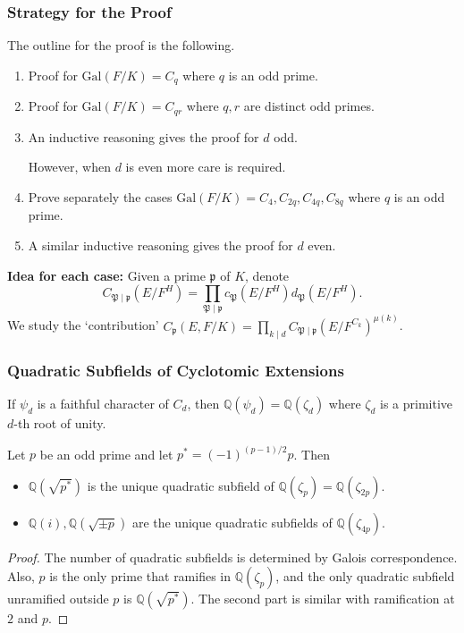 \documentclass{beamer}
\newcommand{\Gal}{\mathrm{Gal}}
\newcommand{\PP}{\mathfrak{P}}
\newcommand{\QQ}{\mathbb{Q}}
\newcommand{\pp}{\mathfrak{p}}
\theoremstyle{plain}
\begin{document}
\begin{frame}
    \frametitle{Strategy for the Proof}
    The outline for the proof is the following.
    \begin{enumerate}
        \item Proof for $\Gal(F/K)=C_{q}$ where $q$ is an odd prime.
        \item Proof for $\Gal(F/K)=C_{qr}$ where $q,r$ are distinct odd primes.
        \item An inductive reasoning gives the proof for $d$ odd.
        \vspace{0.1cm}

        However, when $d$ is even more care is required.
        \item Prove separately the cases $\Gal(F/K)=C_4, C_{2q}, C_{4q}, C_{8q}$ where $q$ is an odd prime.
        \item A similar inductive reasoning gives the proof for $d$ even.
    \end{enumerate}
    \textbf{Idea for each case:} Given a prime $\pp$ of $K$, denote $$C_{\PP\mid\pp}(E/F^H)=\prod_{\PP\mid\pp}c_\PP(E/F^H)d_\PP(E/F^H).$$
    We study the `contribution' $C_\pp(E,F/K)=\prod_{k\mid d}C_{\PP\mid\pp}(E/F^{C_k})^{\mu(k)}$.
\end{frame}

\begin{frame}
    \frametitle{Quadratic Subfields of Cyclotomic Extensions}
    If $\psi_d$ is a faithful character of $C_d$, then $\QQ(\psi_d)=\QQ(\zeta_d)$ where $\zeta_d$ is a primitive $d$-th root of unity.

    \begin{lemma}
        Let $p$ be an odd prime and let $p^*=(-1)^{(p-1)/2}p$. Then
        \begin{itemize}
            \item $\QQ(\sqrt{p^*})$ is the unique quadratic subfield of $\QQ(\zeta_{p})=\QQ(\zeta_{2p})$.
            \item $\QQ(i), \QQ(\sqrt{\pm p})$ are the unique quadratic subfields of $\QQ(\zeta_{4p})$.
        \end{itemize}
    \end{lemma}
    \begin{proof}
        The number of quadratic subfields is determined by Galois correspondence. Also, $p$ is the only prime that ramifies in $\QQ(\zeta_p)$, and the only quadratic subfield unramified outside $p$ is $\QQ(\sqrt{p^*})$. The second part is similar with ramification at $2$ and $p$.
    \end{proof}
\end{frame}
\end{document}
